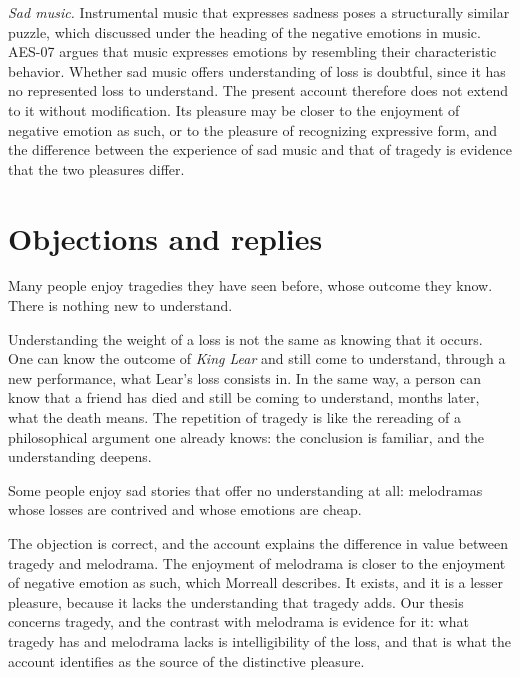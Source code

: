 \documentclass{situationist-preprint}
\begin{document}
\emph{Sad music.} Instrumental music that expresses sadness poses a structurally similar puzzle, which \citet{Levinson1982} discussed under the heading of the negative emotions in music. AES-07 argues that music expresses emotions by resembling their characteristic behavior. Whether sad music offers understanding of loss is doubtful, since it has no represented loss to understand. The present account therefore does not extend to it without modification. Its pleasure may be closer to the enjoyment of negative emotion as such, or to the pleasure of recognizing expressive form, and the difference between the experience of sad music and that of tragedy is evidence that the two pleasures differ.

\section{Objections and replies}

\begin{objection}
Many people enjoy tragedies they have seen before, whose outcome they know. There is nothing new to understand.
\end{objection}

\begin{reply}
Understanding the weight of a loss is not the same as knowing that it occurs. One can know the outcome of \emph{King Lear} and still come to understand, through a new performance, what Lear's loss consists in. In the same way, a person can know that a friend has died and still be coming to understand, months later, what the death means. The repetition of tragedy is like the rereading of a philosophical argument one already knows: the conclusion is familiar, and the understanding deepens.
\end{reply}

\begin{objection}
Some people enjoy sad stories that offer no understanding at all: melodramas whose losses are contrived and whose emotions are cheap.
\end{objection}

\begin{reply}
The objection is correct, and the account explains the difference in value between tragedy and melodrama. The enjoyment of melodrama is closer to the enjoyment of negative emotion as such, which Morreall describes. It exists, and it is a lesser pleasure, because it lacks the understanding that tragedy adds. Our thesis concerns tragedy, and the contrast with melodrama is evidence for it: what tragedy has and melodrama lacks is intelligibility of the loss, and that is what the account identifies as the source of the distinctive pleasure.
\end{reply}
\end{document}
